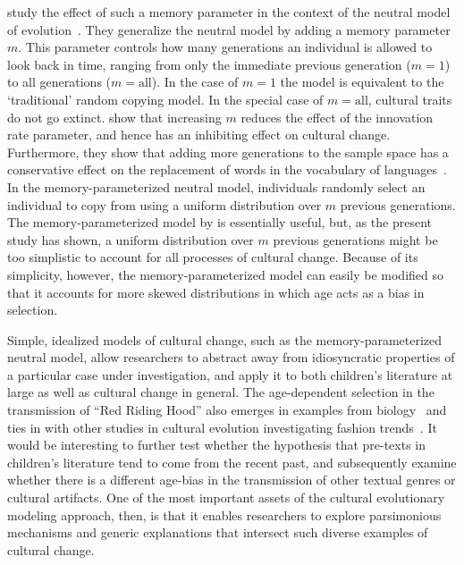 \citeauthor{bentley:2011} study the effect of such a memory parameter in the context of the neutral model of evolution~\autocite{bentley:2011}. They generalize the neutral model by adding a memory parameter $m$. This parameter controls how many generations an individual is allowed to look back in time, ranging from only the immediate previous generation ($m=1$) to all generations ($m=\textrm{all}$). In the case of $m=1$ the model is equivalent to the `traditional' random copying model. In the special case of $m=\textrm{all}$, cultural traits do not go extinct. \citeauthor{bentley:2011} show that increasing $m$ reduces the effect of the innovation rate parameter, and hence has an inhibiting effect on cultural change. Furthermore, they show that adding more generations to the sample space has a conservative effect on the replacement of words in the vocabulary of languages~\autocite{bentley-comment:2011}. In the memory-parameterized neutral model, individuals randomly select an individual to copy from using a uniform distribution over $m$ previous generations. The memory-parameterized model by \citeauthor{bentley:2011} is essentially useful, but, as the present study has shown, a uniform distribution over $m$ previous generations might be too simplistic to account for all processes of cultural change. Because of its simplicity, however, the memory-parameterized model can easily be modified so that it accounts for more skewed distributions in which age acts as a bias in selection.

Simple, idealized models of cultural change, such as the memory-parameterized neutral model, allow researchers to abstract away from idiosyncratic properties of a particular case under investigation, and apply it to both children's literature at large as well as cultural change in general. The age-dependent selection in the transmission of ``Red Riding Hood'' also emerges in examples from biology~\autocite[E.g.][]{Grunst:2014} and ties in with other studies in cultural evolution investigating fashion trends~\autocite[E.g.][]{Acerbi:2012id,kandler:2015,Mauch:2015ix}. It would be interesting to further test whether the hypothesis that pre-texts in children's literature tend to come from the recent past, and subsequently examine whether there is a different age-bias in the transmission of other textual genres or cultural artifacts. One of the most important assets of the cultural evolutionary modeling approach, then, is that it enables researchers to explore parsimonious mechanisms and generic explanations that intersect such diverse examples of cultural change.

